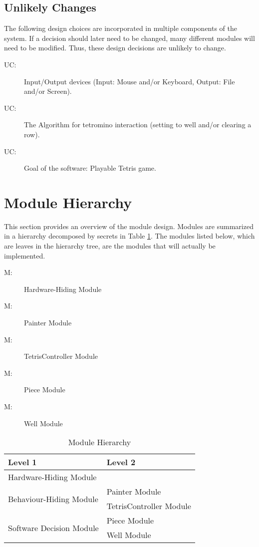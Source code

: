 \documentclass[12pt, titlepage]{article}
\newcounter{ucnum}
\newcommand{\uctheucnum}{UC\theucnum}
\newcounter{mnum}
\newcommand{\mthemnum}{M\themnum}
\begin{document}
\subsection{Unlikely Changes} \label{SecUchange}
The following design choices are incorporated in multiple components of the system. If
a decision should later need to be changed, many different modules will need to be 
modified. Thus, these design decisions are unlikely to change.
\begin{description}
\item[ \uctheucnum \label{ucIO}:] Input/Output devices
  (Input: Mouse and/or Keyboard, Output: File and/or Screen).
\item[ \uctheucnum \label{ucAlgorithm}:] The Algorithm
  for tetromino interaction (setting to well and/or clearing a row).
\item[ \uctheucnum \label{ucGoal}:] Goal of the software:
  Playable Tetris game.
\end{description}


\section{Module Hierarchy} \label{SecMH}
This section provides an overview of the module design. Modules are summarized
in a hierarchy decomposed by secrets in Table \ref{TblMH}. The modules listed
below, which are leaves in the hierarchy tree, are the modules that will
actually be implemented.
\begin{description}
\item [ \mthemnum \label{mHH}:] Hardware-Hiding Module
\item [ \mthemnum \label{mOM}:] Painter Module
\item [ \mthemnum \label{mIM}:] TetrisController Module
\item [ \mthemnum \label{mGL}:] Piece Module
\item [ \mthemnum \label{mGG}:] Well Module
\end{description}
\begin{table}[h!]
\centering
\begin{tabular}{p{} p{}}
\toprule
\textbf{Level 1} & \textbf{Level 2}\\
\midrule
{Hardware-Hiding Module} & ~ \\
\midrule
\multirow{2}{0.3\textwidth}{Behaviour-Hiding Module} & Painter Module\\
& TetrisController Module\\
\midrule
\multirow{2}{0.3\textwidth}{Software Decision Module} &  Piece Module\\
& Well Module\\

\bottomrule
\end{tabular}
\caption{Module Hierarchy}
\label{TblMH}
\end{table}
\end{document}

